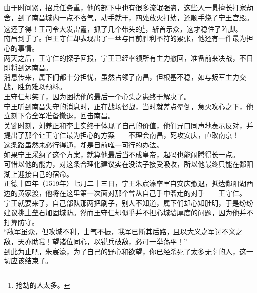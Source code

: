 \begin{multicols}{\theparacolNo}
由于时间紧，招兵任务重，他的部下中也有很多流氓强盗，这些人一贯擅长打家劫舍，到了南昌城内一点不客气，动手就干，四处放火打劫，还顺手烧了宁王宫殿。\\

这还了得！王司令大发雷霆，抓了几个带头的\footnote{抢劫的人太多。}，斩首示众，这才稳住了阵脚。\\

南昌到手了。但王守仁却表现出了一丝与目前胜利不符的紧张，他还有一件最为担心的事情。\\

两天之后，王守仁的探子回报，宁王已经率领所有主力撤回，准备前来决战，不日即将到达南昌。\\

消息传来，属下们都十分担忧，虽然占领了南昌，但根基不稳，如与叛军主力交战，胜负难以预料。\\

王守仁却笑了，因为困扰他的最后一个心头之患终于解决了。\\

宁王听到南昌失守的消息时，正在战场督战，当时就差点晕倒，急火攻心之下，他立刻下令全军准备撤退，回击南昌。\\

关键时刻，刘养正和李士实终于体现了自己的价值，他们异口同声地表示反对，并提出了那个让王守仁最为担心的方案——不理会南昌，死攻安庆，直取南京！\\

这条路虽然未必行得通，却是目前唯一可行的办法。\\

如果宁王采纳了这个方案，就算他最后当不成皇帝，起码也能闹腾得长一点。\\

可惜以他的能力，对这条合理化建议实在没法子接受吸收，所以他最终只能在鄱阳湖上迎接自己的宿命。\\

正德十四年（1519年）七月二十三日，宁王朱宸濠率军自安庆撤退，抵达鄱阳湖西边的黄家渡，他将在这里第一次面对那个曾从自己手中溜走的对手——王守仁。\\

宁王就要来了，自己部队那两把刷子，别人不知道，属下们却心知肚明，于是纷纷建议挑土垒石加固城防。然而王守仁却似乎并不担心城墙厚度的问题，因为他并不打算防守。\\

“敌军虽众，但攻城不利，士气不振，我军已断其后路，且以大义之军讨不义之敌，天亦助我！望诸位同心，以锐兵破敌，必可一举荡平！”\\

到此为止吧，朱宸濠，为了自己的野心和欲望，你已经杀死了太多无辜的人，这一切应该结束了。\\


\end{multicols}
